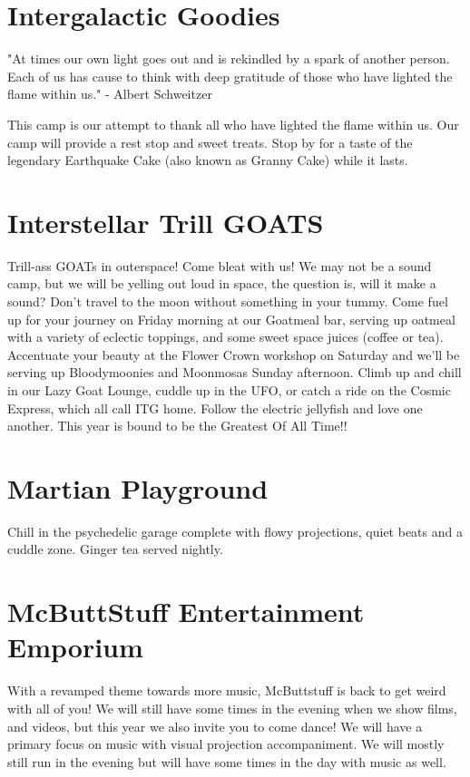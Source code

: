 \begin{multicols}{2}
\section*{Intergalactic Goodies}
"At times our own light goes out and is rekindled by a spark of another person. Each of us has cause to think with deep gratitude of those who have lighted the flame within us." - Albert Schweitzer

This camp is our attempt to thank all who have lighted the flame within us. 
Our camp will provide a rest stop and sweet treats. Stop by for a taste of the legendary Earthquake Cake (also known as Granny Cake) while it lasts. 


\section*{Interstellar Trill GOATS }
Trill-ass GOATs in outerspace! Come bleat with us! We may not be a sound camp, but we will be yelling out loud in space, the question is, will it make a sound? Don't travel to the moon without something in your tummy. Come fuel up for your journey on Friday morning at our Goatmeal bar, serving up oatmeal with a variety of eclectic toppings, and some sweet space juices (coffee or tea). Accentuate your beauty at the Flower Crown workshop on Saturday and we'll be serving up Bloodymoonies and Moonmosas Sunday afternoon. Climb up and chill in our Lazy Goat Lounge, cuddle up in the UFO, or catch a ride on the Cosmic Express, which all call ITG home. Follow the electric jellyfish and love one another. This year is bound to be the Greatest Of All Time!!


\section*{Martian Playground}
Chill in the psychedelic garage complete with flowy projections, quiet beats and a cuddle zone. Ginger tea served nightly.


\section*{McButtStuff Entertainment Emporium}
With a revamped theme towards more music, McButtstuff is back to get weird with all of you! We will still have some times in the evening when we show films, and videos, but this year we also invite you to come dance! We will have a primary focus on music with visual projection accompaniment.  We will mostly still run in the evening but will have some times in the day with music as well. 



\end{multicols}
